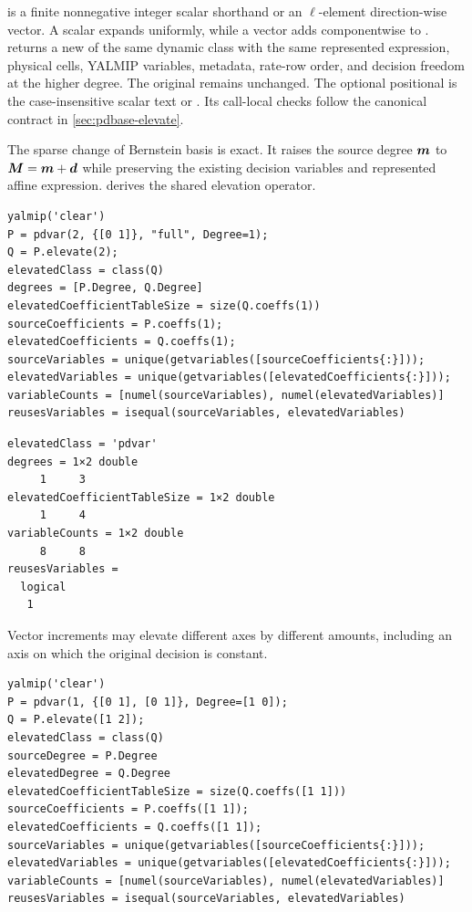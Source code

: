 \descriptionhead
{} is a finite nonnegative integer scalar shorthand or an $\ell$-element direction-wise vector. A scalar expands uniformly, while a vector adds componentwise to .  returns a new  of the same dynamic class with the same represented expression, physical cells, YALMIP variables, metadata, rate-row order, and decision freedom at the higher degree. The original  remains unchanged. The optional positional  is the case-insensitive scalar text  or . Its call-local checks follow the canonical contract in \cref{sec:pdbase-elevate}.

The sparse change of Bernstein basis is exact. It raises the source degree $\boldsymbol{m}$ to $\boldsymbol{M}=\boldsymbol{m}+\boldsymbol{d}$ while preserving the existing decision variables and represented affine expression.  derives the shared elevation operator.

\examplehead
\begin{lstlisting}[style=dpmatlab]
yalmip('clear')
P = pdvar(2, {[0 1]}, "full", Degree=1);
Q = P.elevate(2);
elevatedClass = class(Q)
degrees = [P.Degree, Q.Degree]
elevatedCoefficientTableSize = size(Q.coeffs(1))
sourceCoefficients = P.coeffs(1);
elevatedCoefficients = Q.coeffs(1);
sourceVariables = unique(getvariables([sourceCoefficients{:}]));
elevatedVariables = unique(getvariables([elevatedCoefficients{:}]));
variableCounts = [numel(sourceVariables), numel(elevatedVariables)]
reusesVariables = isequal(sourceVariables, elevatedVariables)
\end{lstlisting}
\begin{lstlisting}[style=dpoutput]
elevatedClass = 'pdvar'
degrees = 1×2 double
     1     3
elevatedCoefficientTableSize = 1×2 double
     1     4
variableCounts = 1×2 double
     8     8
reusesVariables =
  logical
   1
\end{lstlisting}

Vector increments may elevate different axes by different amounts, including an axis on which the original decision is constant.

\begin{lstlisting}[style=dpmatlab]
yalmip('clear')
P = pdvar(1, {[0 1], [0 1]}, Degree=[1 0]);
Q = P.elevate([1 2]);
elevatedClass = class(Q)
sourceDegree = P.Degree
elevatedDegree = Q.Degree
elevatedCoefficientTableSize = size(Q.coeffs([1 1]))
sourceCoefficients = P.coeffs([1 1]);
elevatedCoefficients = Q.coeffs([1 1]);
sourceVariables = unique(getvariables([sourceCoefficients{:}]));
elevatedVariables = unique(getvariables([elevatedCoefficients{:}]));
variableCounts = [numel(sourceVariables), numel(elevatedVariables)]
reusesVariables = isequal(sourceVariables, elevatedVariables)
\end{lstlisting}

